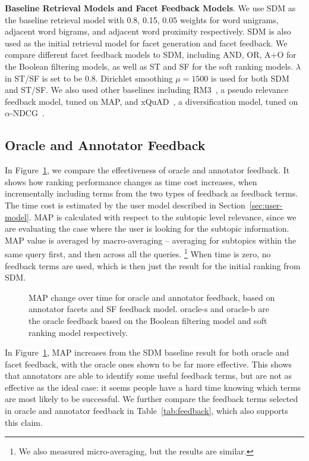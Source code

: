 \textbf{Baseline Retrieval Models and Facet Feedback Models}. We use SDM as the baseline retrieval model with 0.8, 0.15, 0.05 weights for word unigrams, adjacent word bigrams, and adjacent word proximity respectively. SDM is also used as the initial retrieval model for facet generation and facet feedback. We compare different facet feedback models to SDM, including AND, OR, A+O for the Boolean filtering models, as well as ST and SF for the soft ranking models. $\lambda$ in ST/SF is set to be 0.8. Dirichlet smoothing $\mu=1500$ is used for both SDM and ST/SF. We also used other baselines including RM3~\cite{abdul2004umass,lavrenko2001relevance}, a pseudo relevance feedback model, tuned on MAP, and xQuAD~\cite{santos2010exploiting}, a diversification model, tuned on $\alpha$-NDCG~\cite{clarke2008novelty}.

\subsection{Oracle and Annotator Feedback}
In Figure~\ref{fig:feedback}, we compare the effectiveness of oracle and annotator feedback. It shows how ranking performance changes as time cost increases, when incrementally including terms from the two types of feedback as feedback terms. The time cost is estimated by the user model described in Section~\ref{sec:user-model}. MAP is calculated with respect to the subtopic level relevance, since we are evaluating the case where the user is looking for the subtopic information. MAP value is averaged by macro-averaging -- averaging for subtopics within the same query first, and then across all the queries. \footnote{We also measured micro-averaging, but the results are similar.} When time is zero, no feedback terms are used, which is then just the result for the initial ranking from SDM.
\begin{figure}[!ht]
\centering
\caption{MAP change over time for oracle and annotator feedback, based on annotator facets and SF feedback model. oracle-s and oracle-b are the oracle feedback based on the Boolean filtering model and soft ranking model respectively.}
\label{fig:feedback}
\end{figure}

In Figure~\ref{fig:feedback}, MAP increases from the SDM baseline result for both oracle and facet feedback, with the oracle ones shown to be far more effective. This shows that annotators are able to identify some useful feedback terms, but are not as effective as the ideal case: it seems people have a hard time knowing which terms are most likely to be successful. We further compare the feedback terms selected in oracle and annotator feedback in Table~\ref{tab:feedback}, which also supports this claim.

